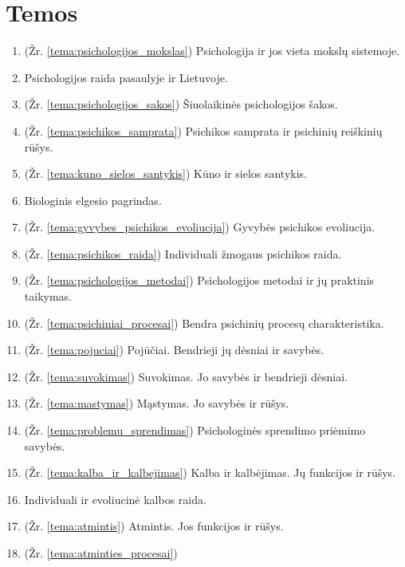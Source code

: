 \chapter{Temos}

\begin{enumerate}
  \item \label{tema_01} (Žr. \ref{tema:psichologijos_mokslas})
    Psichologija ir jos vieta mokslų sistemoje.
  \item \label{tema_02} Psichologijos raida pasaulyje ir Lietuvoje.
  \item \label{tema_03} (Žr. \ref{tema:psichologijos_sakos})
    Šiuolaikinės psichologijos šakos.
  \item \label{tema_04} (Žr. \ref{tema:psichikos_samprata})
    Psichikos samprata ir psichinių reiškinių rūšys.
  \item \label{tema_05} (Žr. \ref{tema:kuno_sielos_santykis})
  Kūno ir sielos santykis.
  \item \label{tema_06} Biologinis elgesio pagrindas.
  \item \label{tema_07} (Žr. \ref{tema:gyvybes_psichikos_evoliucija})
  Gyvybės psichikos evoliucija.
  \item \label{tema_10} (Žr. \ref{tema:psichikos_raida})
  Individuali žmogaus psichikos raida.
  \item \label{tema_11} (Žr. \ref{tema:psichologijos_metodai})
  Psichologijos metodai ir jų praktinis taikymas.
  \item \label{tema_12} (Žr. \ref{tema:psichiniai_procesai})
    Bendra psichinių procesų charakteristika.
  \item \label{tema_13} (Žr. \ref{tema:pojuciai})
    Pojūčiai. Bendrieji jų dėsniai ir savybės.
  \item \label{tema_14} (Žr. \ref{tema:suvokimas})
    Suvokimas. Jo savybės ir bendrieji dėsniai.
  \item \label{tema_15} (Žr. \ref{tema:mastymas})
    Mąstymas. Jo savybės ir rūšys.
  \item \label{tema_16} (Žr. \ref{tema:problemu_sprendimas})
    Psichologinės sprendimo priėmimo savybės.
  \item \label{tema_17} (Žr. \ref{tema:kalba_ir_kalbejimas})
  Kalba ir kalbėjimas. Jų funkcijos ir rūšys.
  \item \label{tema_20} Individuali ir evoliucinė kalbos raida.
  \item \label{tema_21} (Žr. \ref{tema:atmintis})
    Atmintis. Jos funkcijos ir rūšys.
  \item \label{tema_22} (Žr. \ref{tema:atminties_procesai})

\end{enumerate}
